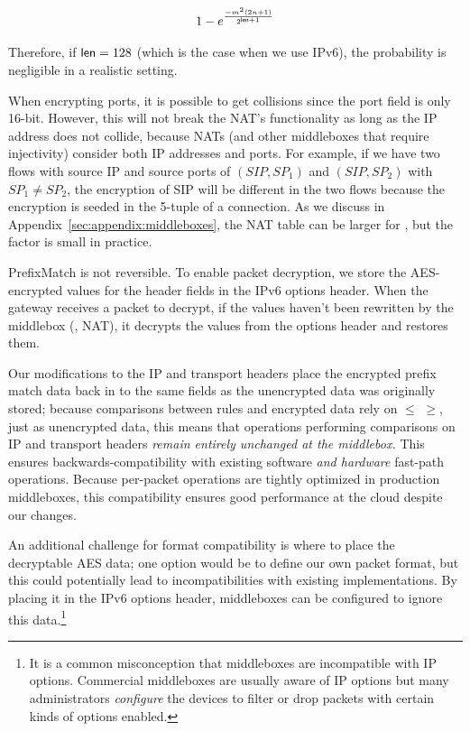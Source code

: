 \begin{equation}
1 - e^\frac{-m^2 (2n+1)}{2^{\mathsf{len}+1}}
\end{equation}


Therefore, if $\mathsf{len}=128$ (which is the case when we use IPv6), the probability is negligible in a realistic setting. 

When encrypting ports, it is possible to get collisions since the port field is only 16-bit. However, this will not break the NAT's functionality as long as the IP address does not collide, because NATs (and other middleboxes that require injectivity) consider both IP addresses and ports. For example, if we have two flows with source IP and source ports of $(SIP, SP_1)$ and $(SIP, SP_2)$ with $SP_1 \neq SP_2$, the encryption of SIP will be different in the two flows because the encryption is seeded in the 5-tuple of a connection. As we discuss in Appendix~\ref{sec:appendix:middleboxes}, the NAT table can be larger for \sys, but the factor is small in practice.




PrefixMatch is not reversible. To enable packet decryption, we store the AES-encrypted values for the header fields in the IPv6 options header. 
When the gateway receives a packet to decrypt, if the values haven't been rewritten by the middlebox (\eg, NAT),
it decrypts the values from the options header and restores them. 

Our modifications to the IP and transport headers place the encrypted prefix match data back in to the same fields as the unencrypted data was originally stored; because comparisons between rules and encrypted data rely on $\leq$ $\geq$, just as unencrypted data, this means that operations performing comparisons on IP and transport headers {\it remain entirely unchanged at the middlebox.}
This ensures backwards-compatibility with existing software {\it and hardware} fast-path operations.
Because per-packet operations are tightly optimized in production middleboxes, this compatibility ensures good performance at the cloud despite our changes.

An additional challenge for format compatibility is where to place the decryptable AES data; one option would be to define our own packet format, but this could potentially lead to incompatibilities with existing implementations. By placing it in the IPv6 options header, middleboxes can be configured to ignore this data.\footnote{It is a common misconception that middleboxes are incompatible with IP options. Commercial middleboxes are usually aware of IP options but many administrators {\it configure} the devices to filter or drop packets with certain kinds of options enabled.}


